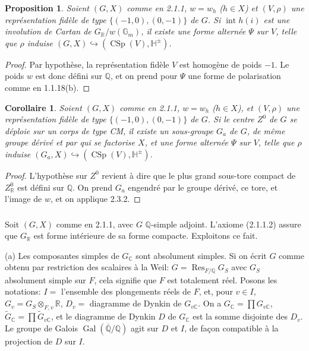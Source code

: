 \documentclass[12pt,a4paper]{article}
\theoremstyle{plain}
\newtheorem{proposition}[theorem]{Proposition}
\newtheorem{corollary}[theorem]{Corollaire}
\theoremstyle{definition}
\theoremstyle{remark}
\DeclareMathOperator{\CSp}{CSp}
\DeclareMathOperator{\Gal}{Gal}
\DeclareMathOperator{\Res}{Res}
\DeclareMathOperator{\Int}{int}
\newcommand{\QQ}{\mathbb{Q}}
\newcommand{\RR}{\mathbb{R}}
\newcommand{\CC}{\mathbb{C}}
\newcommand{\HH}{\mathbb{H}}
\newcommand{\Gm}{\mathbb{G}}
\begin{document}
\begin{proposition}
Soient $(G,X)$ comme en 2.1.1, $w = w_h$ ($h \in X$) et $(V,\rho)$ une repr\'esentation fid\`ele de type $\{(-1,0),(0,-1)\}$ de $G$. Si $\Int h(i)$ est une involution de Cartan de $G_{\RR}/w(\Gm_m)$, il existe une forme altern\'ee $\Psi$ sur $V$, telle que $\rho$ induise $(G,X) \hookrightarrow (\CSp(V),\HH^{\pm})$.
\end{proposition}

\begin{proof}
Par hypoth\`ese, la repr\'esentation fid\`ele $V$ est homog\`ene de poids $-1$. Le poids $w$ est donc d\'efini sur $\QQ$, et on prend pour $\Psi$ une forme de polarisation comme en 1.1.18(b).
\end{proof}

\begin{corollary}
Soient $(G,X)$ comme en 2.1.1, $w = w_h$ ($h \in X$), et $(V,\rho)$ une repr\'esentation fid\`ele de type $\{(-1,0),(0,-1)\}$ de $G$. Si le centre $Z^0$ de $G$ se d\'eploie sur un corps de type CM, il existe un sous-groupe $G_a$ de $G$, de m\^eme groupe d\'eriv\'e et par qui se factorise $X$, et une forme altern\'ee $\Psi$ sur $V$, telle que $\rho$ induise $(G_a,X) \hookrightarrow (\CSp(V),\HH^{\pm})$.
\end{corollary}

\begin{proof}
L'hypoth\`ese sur $Z^0$ revient \`a dire que le plus grand sous-tore compact de $Z^0_{\RR}$ est d\'efini sur $\QQ$. On prend $G_a$ engendr\'e par le groupe d\'eriv\'e, ce tore, et l'image de $w$, et on applique 2.3.2.
\end{proof}

\subsubsection{}

Soit $(G,X)$ comme en 2.1.1, avec $G$ $\QQ$-simple adjoint. L'axiome (2.1.1.2) assure que $G_{\RR}$ est forme int\'erieure de sa forme compacte. Exploitons ce fait.

(a) Les composantes simples de $G_{\CC}$ sont absolument simples. Si on \'ecrit $G$ comme obtenu par restriction des scalaires \`a la Weil: $G = \Res_{F/\QQ} G_S$ avec $G_S$ absolument simple sur $F$, cela signifie que $F$ est totalement r\'eel. Posons les notations: $I =$ l'ensemble des plongements r\'eels de $F$, et, pour $v \in I$, $G_v = G_S \otimes_{F,v} \RR$, $D_v =$ diagramme de Dynkin de $G_{v\CC}$. On a $G_{\CC} = \prod G_{v\CC}$, $\tilde{G}_{\CC} = \prod \tilde{G}_{v\CC}$, et le diagramme de Dynkin $D$ de $G_{\CC}$ est la somme disjointe des $D_v$. Le groupe de Galois $\Gal(\overline{\QQ}/\QQ)$ agit sur $D$ et $I$, de fa\c{c}on compatible \`a la projection de $D$ sur $I$.
\end{document}
